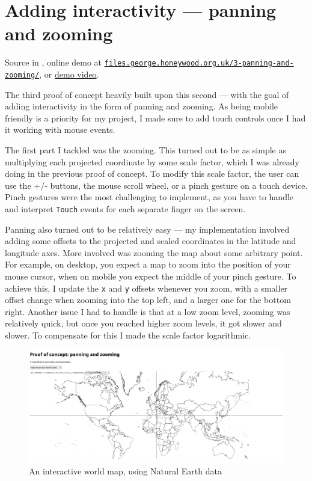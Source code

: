 \documentclass[hyphens]{final_report}
\begin{document}
\section{Adding interactivity --- panning and zooming}

{ \footnotesize Source in , online demo at \href{https://files.george.honeywood.org.uk/3-panning-and-zooming/}{\nolinkurl{files.george.honeywood.org.uk/3-panning-and-zooming/}}, or \href{https://youtu.be/_JvGwLra_Q4}{demo video}.}

The third proof of concept heavily built upon this second --- with the goal of adding interactivity in the form of panning and zooming. As being mobile friendly is a priority for my project, I made sure to add touch controls once I had it working with mouse events.

The first part I tackled was the zooming. This turned out to be as simple as multiplying each projected coordinate by some scale factor, which I was already doing in the previous proof of concept. To modify this scale factor, the user can use the +/- buttons, the mouse scroll wheel, or a pinch gesture on a touch device. Pinch gestures were the most challenging to implement, as you have to handle and interpret \texttt{Touch} events for each separate finger on the screen.

Panning also turned out to be relatively easy --- my implementation involved adding some offsets to the projected and scaled coordinates in the latitude and longitude axes. More involved was zooming the map about some arbitrary point. For example, on desktop, you expect a map to zoom into the position of your mouse cursor, when on mobile you expect the middle of your pinch gesture. To achieve this, I update the \texttt{x} and \texttt{y} offsets whenever you zoom, with a smaller offset change when zooming into the top left, and a larger one for the bottom right. Another issue I had to handle is that at a low zoom level, zooming was relatively quick, but once you reached higher zoom levels, it got slower and slower. To compensate for this I made the scale factor logarithmic.

\begin{figure}[ht]
    \centering
    \includegraphics[width=\textwidth]{../proof-of-concepts/3-panning-and-zooming/screenshots/the-world.png}
    \caption{An interactive world map, using Natural Earth data~\cite{natural-earth}}\label{fig:panning-and-zooming}
\end{figure}
\end{document}
